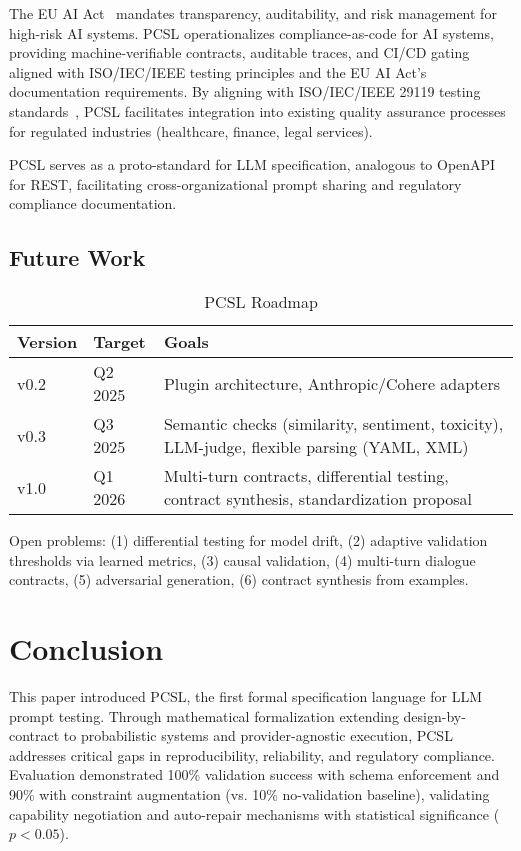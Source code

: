 \documentclass[sigconf]{acmart}
\begin{document}
The EU AI Act~\cite{euaiact2024} mandates transparency, auditability, and risk management for high-risk AI systems. PCSL operationalizes compliance-as-code for AI systems, providing machine-verifiable contracts, auditable traces, and CI/CD gating aligned with ISO/IEC/IEEE testing principles and the EU AI Act's documentation requirements. By aligning with ISO/IEC/IEEE 29119 testing standards~\cite{iso29119}, PCSL facilitates integration into existing quality assurance processes for regulated industries (healthcare, finance, legal services).

PCSL serves as a proto-standard for LLM specification, analogous to OpenAPI for REST, facilitating cross-organizational prompt sharing and regulatory compliance documentation.

\subsection{Future Work}

\begin{table}[H]
\centering
\caption{PCSL Roadmap}
\label{tab:roadmap}
\scriptsize
\begin{tabular}{@{}llp{4.5cm}@{}}
\toprule
\textbf{Version} & \textbf{Target} & \textbf{Goals} \\
\midrule
v0.2 & Q2 2025 & Plugin architecture, Anthropic/Cohere adapters \\
v0.3 & Q3 2025 & Semantic checks (similarity, sentiment, toxicity), LLM-judge, flexible parsing (YAML, XML) \\
v1.0 & Q1 2026 & Multi-turn contracts, differential testing, contract synthesis, standardization proposal \\
\bottomrule
\end{tabular}
\end{table}

Open problems: (1) differential testing for model drift, (2) adaptive validation thresholds via learned metrics, (3) causal validation, (4) multi-turn dialogue contracts, (5) adversarial generation, (6) contract synthesis from examples.

\section{Conclusion}

This paper introduced PCSL, the first formal specification language for LLM prompt testing. Through mathematical formalization extending design-by-contract to probabilistic systems and provider-agnostic execution, PCSL addresses critical gaps in reproducibility, reliability, and regulatory compliance. Evaluation demonstrated 100\% validation success with schema enforcement and 90\% with constraint augmentation (vs. 10\% no-validation baseline), validating capability negotiation and auto-repair mechanisms with statistical significance (\(p < 0.05\)).
\end{document}
